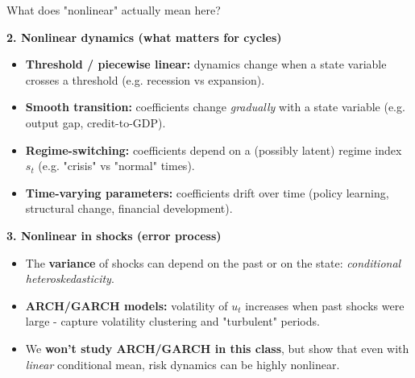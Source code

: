 \documentclass{beamer}
\begin{document}
\begin{frame}{What does "nonlinear" actually mean here?}
\small

\textbf{2. Nonlinear dynamics (what matters for cycles)}
\begin{itemize}
  \item \textbf{Threshold / piecewise linear:} dynamics change when a state variable
        crosses a threshold (e.g. recession vs expansion).
  \item \textbf{Smooth transition:} coefficients change \emph{gradually} with a
        state variable (e.g. output gap, credit-to-GDP).
  \item \textbf{Regime-switching:} coefficients depend on a (possibly latent)
        regime index $s_t$ (e.g. "crisis" vs "normal" times).
  \item \textbf{Time-varying parameters:} coefficients drift over time
        (policy learning, structural change, financial development).
\end{itemize}

\bigskip
\pause
\textbf{3. Nonlinear in shocks (error process)}
\begin{itemize}
  \item The \textbf{variance} of shocks can depend on the past or on the state:
        \emph{conditional heteroskedasticity}.
  \item \textbf{ARCH/GARCH models:} volatility of $u_t$ increases when past shocks
        were large - capture volatility clustering and "turbulent" periods.
  \item We \textbf{won't study ARCH/GARCH in this class}, but show that
        even with \emph{linear} conditional mean, risk dynamics can be highly nonlinear.
\end{itemize}

\end{frame}
\end{document}
